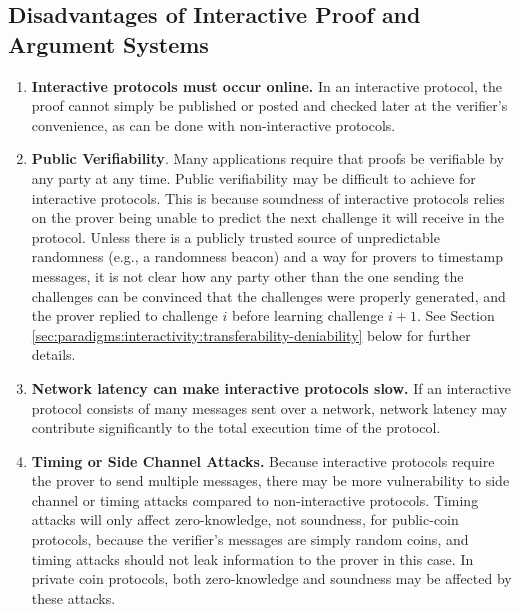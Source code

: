 \subsection{Disadvantages of Interactive Proof and Argument Systems}
\label{sec:paradigms:interactivity:disadvantages}

\begin{enumerate}[label=\arabic*.]

\item \textbf{Interactive protocols must occur online.} 
In an interactive protocol, the proof cannot simply be published or posted and checked later at the verifier's convenience, as can be done with non-interactive protocols.

\item \textbf{Public Verifiability}. 
Many applications require that proofs be verifiable by any party at any time. 
Public verifiability may be difficult to achieve for interactive protocols.
This is because soundness of interactive protocols relies on the prover being unable to predict the next challenge it will receive in the protocol.
Unless there is a publicly trusted source of unpredictable randomness (e.g., a randomness beacon) and a way for provers to timestamp messages, it is not clear how any party other than
the one sending the challenges can be convinced that the challenges were properly generated, and the prover replied to challenge $i$ before learning challenge $i+1$.
See Section \ref{sec:paradigms:interactivity:transferability-deniability} below for further details.

\item \textbf{Network latency can make interactive protocols slow.} 
If an interactive protocol consists of many messages sent over a network, network latency may contribute significantly to the total execution time of the protocol.

\item \textbf{Timing or Side Channel Attacks.} 
Because interactive protocols require the prover to send multiple messages, there may be more vulnerability to side channel or timing attacks compared to non-interactive protocols.
Timing attacks will only affect zero-knowledge, not soundness, for public-coin protocols, because the verifier's messages are simply random coins, and timing attacks should not leak information to the prover in this case.
In private coin protocols, both zero-knowledge and soundness may be affected by these attacks.


\end{enumerate}
